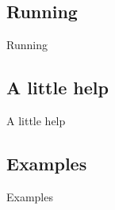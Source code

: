 \documentclass{beamer}
\begin{document}
\subsection{Running}
\begin{frame}{Running} 
	
\end{frame}

\subsection{A little help}
\begin{frame}{A little help} 
	
\end{frame}

\subsection{Examples}
\begin{frame}{Examples} 
	
\end{frame}
\end{document}
